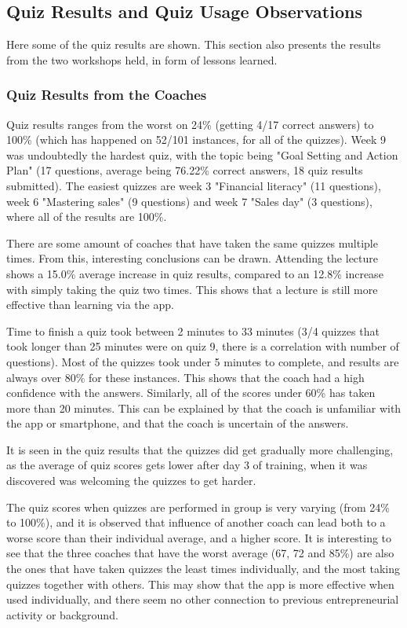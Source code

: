 \subsection{Quiz Results and Quiz Usage Observations}


    Here some of the quiz results are shown. This section also presents the results from the two workshops held, in form of lessons learned.

    \subsubsection{Quiz Results from the Coaches}

    Quiz results ranges from the worst on 24\% (getting 4/17 correct answers) to 100\% (which has happened on 52/101 instances, for all of the quizzes). Week 9 was undoubtedly the hardest quiz, with the topic being "Goal Setting and Action Plan" (17 questions, average being 76.22\% correct answers, 18 quiz results submitted). The easiest quizzes are week 3 "Financial literacy" (11 questions), week 6 "Mastering sales" (9 questions) and week 7 "Sales day" (3 questions), where all of the results are 100\%.

    There are some amount of coaches that have taken the same quizzes multiple times. From this, interesting conclusions can be drawn. Attending the lecture shows a 15.0\% average increase in quiz results, compared to an 12.8\% increase with simply taking the quiz two times. This shows that a lecture is still more effective than learning via the app.

    Time to finish a quiz took between 2 minutes to 33 minutes (3/4 quizzes that took longer than 25 minutes were on quiz 9, there is a correlation with number of questions). Most of the quizzes took under 5 minutes to complete, and results are always over 80\% for these instances. This shows that the coach had a high confidence with the answers. Similarly, all of the scores under 60\% has taken more than 20 minutes. This can be explained by that the coach is unfamiliar with the app or smartphone, and that the coach is uncertain of the answers.

    It is seen in the quiz results that the quizzes did get gradually more challenging, as the average of quiz scores gets lower after day 3 of training, when it was discovered was welcoming the quizzes to get harder.

    The quiz scores when quizzes are performed in group is very varying (from 24\% to 100\%), and it is observed that influence of another coach can lead both to a worse score than their individual average, and a higher score. It is interesting to see that the three coaches that have the worst average (67, 72 and 85\%) are also the ones that have taken quizzes the least times individually, and the most taking quizzes together with others. This may show that the app is more effective when used individually, and there seem no other connection to previous entrepreneurial activity or background.

